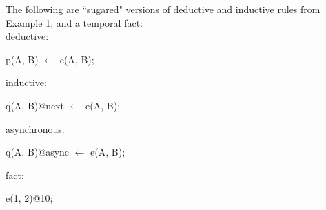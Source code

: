 \begin{example}
The following are ``sugared" versions of deductive and inductive rules from Example 1, and a temporal fact:
\\
deductive:
\begin{Dedalus}
p(A, B) \(\leftarrow\) e(A, B);
\end{Dedalus}
inductive:
\begin{Dedalus}
q(A, B)@next \(\leftarrow\) e(A, B);
\end{Dedalus}
asynchronous:
\begin{Dedalus}
q(A, B)@async \(\leftarrow\) e(A, B);
\end{Dedalus}
fact:
\begin{Dedalus}
e(1, 2)@10;
\end{Dedalus}

\end{example}


% 
% 





%
%



